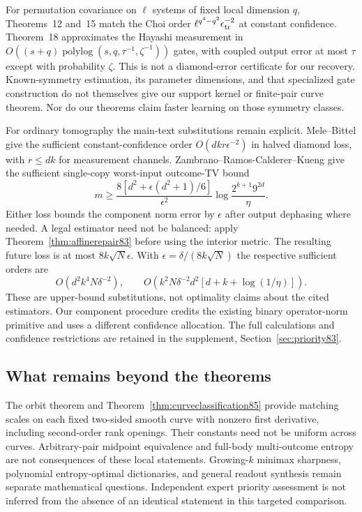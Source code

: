 For permutation covariance on $\ell$ systems of fixed local dimension
$q$, Theorems~12 and~15 match the Choi order
$\ell^{q^4-q^2}\epsilon_{\rm tr}^{-2}$ at constant confidence.
Theorem~18 approximates the Hayashi measurement in
$O((s+q)\operatorname{polylog}(s,q,\tau^{-1},\zeta^{-1}))$ gates,
with coupled output error at most $\tau$ except with probability
$\zeta$.  This is not a diamond-error certificate for our recovery.
Known-symmetry estimation, its parameter dimensions, and that
specialized gate construction do not themselves give our support
kernel or finite-pair curve theorem.  Nor do our theorems claim
faster learning on those symmetry classes.

For ordinary tomography the main-text substitutions remain explicit.
Mele--Bittel \cite[Theorem~III.3]{MB67} give the sufficient
constant-confidence order $O(dkr\epsilon^{-2})$ in halved diamond
loss, with $r\le dk$ for measurement channels.
Zambrano--Ramos-Calderer--Kueng \cite[Theorem~2]{ZRK76} give the
sufficient single-copy worst-input outcome-TV bound
\[
 m\ge\frac{8[d^2+\epsilon(d^2+1)/6]}{\epsilon^2}
          \log\frac{2^{k+1}9^{2d}}{\eta}.
\]
Either loss bounds the component norm error by $\epsilon$ after
output dephasing where needed.  A legal estimator need not be
balanced: apply Theorem~\ref{thm:affinerepair83} before using the
interior metric.  The resulting future loss is at most
$8k\sqrt N\epsilon$.  With $\epsilon=\delta/(8k\sqrt N)$ the
respective sufficient orders are
\[
 O(d^2k^4N\delta^{-2}),\qquad
 O\!\left(k^2N\delta^{-2}d^2[d+k+\log(1/\eta)]\right).
\]
These are upper-bound substitutions, not optimality claims about
the cited estimators.  Our component procedure credits the existing
binary operator-norm primitive and uses a different confidence
allocation.  The full calculations and confidence restrictions
are retained in the supplement, Section~\ref{sec:priority83}.

\subsection{What remains beyond the theorems}
The orbit theorem and Theorem~\ref{thm:curveclassification85} provide
matching scales on each fixed two-sided smooth curve with nonzero
first derivative, including second-order rank openings.  Their
constants need not be uniform across curves.  Arbitrary-pair
midpoint equivalence and full-body multi-outcome entropy are not
consequences of these local statements.  Growing-$k$ minimax sharpness,
polynomial entropy-optimal dictionaries, and general readout synthesis
remain separate mathematical questions.  Independent expert priority
assessment is not inferred from the absence of an identical statement
in this targeted comparison.


